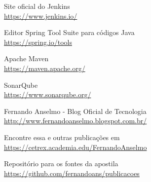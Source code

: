 \documentclass[a4paper,11pt]{article}
\begin{document}
\begin{thebibliography}{7}
  Site oficial do Jenkins \\
  \url{https://www.jenkins.io/}

  Editor Spring Tool Suite para códigos Java \\
  \url{https://spring.io/tools}
  
  Apache Maven \\
  \url{https://maven.apache.org/}

  SonarQube \\
  \url{https://www.sonarqube.org/}

  Fernando Anselmo - Blog Oficial de Tecnologia \\
  \url{http://www.fernandoanselmo.blogspot.com.br/}

  Encontre essa e outras publicações em \\
  \url{https://cetrex.academia.edu/FernandoAnselmo}	
  
  Repositório para os fontes da apostila \\
  \url{https://github.com/fernandoans/publicacoes}
\end{thebibliography}
\end{document}
